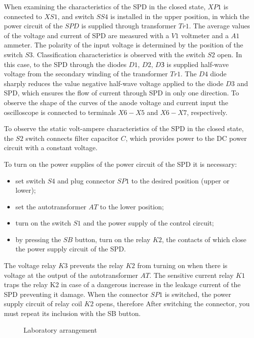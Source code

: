 \documentclass[a4paper,14pt]{article}
\begin{document}
When examining the characteristics of the SPD in the closed state, $XP1$ is connected to $XS1$, and switch $SS4$
is installed in the upper position, in which the power circuit of the $SPD$ is supplied  through
transformer $Tr1$. 
The average values of the voltage and current of SPD are measured with a $V1$ voltmeter and a $A1$ ammeter.
The polarity of the input voltage is determined by the position of the switch $S3$. 
Classification characteristics is observed with the switch $S2$ open. 
In this case, to the SPD through the diodes $D1$, $D2$, $DЗ$ is supplied
half-wave voltage from the secondary winding of the transformer $Tr1$. 
The $D4$ diode sharply reduces the value
negative half-wave voltage applied to the diode $D3$ and SPD, which ensures the flow of current
through SPD in only one direction. To observe the shape of the curves of the anode voltage and current input
the oscilloscope is connected to terminals $X6-X5$ and $X6-X7$, respectively.

To observe the static volt-ampere characteristics of the SPD in the closed state, the $S2$ switch connects
filter capacitor $C$, which provides power to the DC power circuit with a constant voltage.

To turn on the power supplies of the power circuit of the SPD it is necessary:

\begin{itemize}
\item set switch $S4$ and plug connector $SP1$ to the desired position (upper or lower);
\item set the autotransformer $AT$ to the lower position;
\item turn on the switch $S1$ and the power supply of the control circuit;
\item by pressing the $SB$ button, turn on the relay $K2$, 
the contacts of which close the power supply circuit of the SPD.
\end{itemize}

The voltage relay $K3$ prevents the relay $K2$ from turning on when there is voltage at the output 
of the autotransformer $AT$.
The sensitive current relay $K1$ traps the relay K2 in case of a dangerous increase in the leakage current 
of the SPD preventing it damage. When the connector $SP1$ is switched, 
the power supply circuit of relay coil $K2$ opens, therefore
After switching the connector, you must repeat its inclusion with the SB button.

\begin{landscape}
        \hspace{-3cm}
        \vspace{1cm}
\begin{figure}[ht!] 
 
\caption{Laboratory arrangement}
\label{labsetup}
\end{figure}
\end{landscape}
\end{document}
